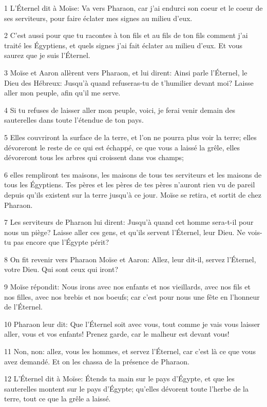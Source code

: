 \par 1 L'Éternel dit à Moïse: Va vers Pharaon, car j'ai endurci son coeur et le coeur de ses serviteurs, pour faire éclater mes signes au milieu d'eux.
\par 2 C'est aussi pour que tu racontes à ton fils et au fils de ton fils comment j'ai traité les Égyptiens, et quels signes j'ai fait éclater au milieu d'eux. Et vous saurez que je suis l'Éternel.
\par 3 Moïse et Aaron allèrent vers Pharaon, et lui dirent: Ainsi parle l'Éternel, le Dieu des Hébreux: Jusqu'à quand refuseras-tu de t'humilier devant moi? Laisse aller mon peuple, afin qu'il me serve.
\par 4 Si tu refuses de laisser aller mon peuple, voici, je ferai venir demain des sauterelles dans toute l'étendue de ton pays.
\par 5 Elles couvriront la surface de la terre, et l'on ne pourra plus voir la terre; elles dévoreront le reste de ce qui est échappé, ce que vous a laissé la grêle, elles dévoreront tous les arbres qui croissent dans vos champs;
\par 6 elles rempliront tes maisons, les maisons de tous tes serviteurs et les maisons de tous les Égyptiens. Tes pères et les pères de tes pères n'auront rien vu de pareil depuis qu'ils existent sur la terre jusqu'à ce jour. Moïse se retira, et sortit de chez Pharaon.
\par 7 Les serviteurs de Pharaon lui dirent: Jusqu'à quand cet homme sera-t-il pour nous un piège? Laisse aller ces gens, et qu'ils servent l'Éternel, leur Dieu. Ne vois-tu pas encore que l'Égypte périt?
\par 8 On fit revenir vers Pharaon Moïse et Aaron: Allez, leur dit-il, servez l'Éternel, votre Dieu. Qui sont ceux qui iront?
\par 9 Moïse répondit: Nous irons avec nos enfants et nos vieillards, avec nos fils et nos filles, avec nos brebis et nos boeufs; car c'est pour nous une fête en l'honneur de l'Éternel.
\par 10 Pharaon leur dit: Que l'Éternel soit avec vous, tout comme je vais vous laisser aller, vous et vos enfants! Prenez garde, car le malheur est devant vous!
\par 11 Non, non: allez, vous les hommes, et servez l'Éternel, car c'est là ce que vous avez demandé. Et on les chassa de la présence de Pharaon.
\par 12 L'Éternel dit à Moïse: Étends ta main sur le pays d'Égypte, et que les sauterelles montent sur le pays d'Égypte; qu'elles dévorent toute l'herbe de la terre, tout ce que la grêle a laissé.
